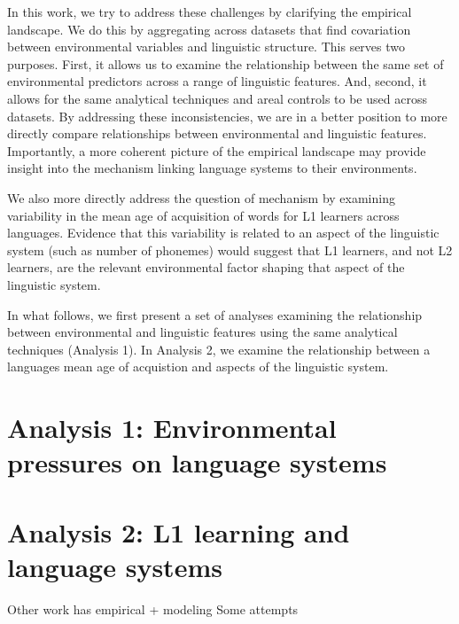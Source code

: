 \documentclass[10pt,letterpaper]{article}
\begin{document}
In this work, we try to address these challenges by clarifying the empirical landscape. We do this by aggregating across datasets that find covariation between environmental variables and linguistic structure. This serves two purposes. First, it allows us to examine the relationship between the same set of environmental predictors across a range of linguistic features. And, second, it allows for the same analytical techniques and areal controls to be used across datasets. By addressing these inconsistencies, we are in a better position to more directly compare relationships between environmental and linguistic features. Importantly, a more coherent picture of the empirical landscape may provide insight into the mechanism linking language systems to their environments.

We also more directly address the question of mechanism by examining variability in the mean age of acquisition of words for L1 learners across languages. Evidence that this variability is related to an aspect of the linguistic system (such as number of phonemes) would suggest that L1 learners, and not L2 learners, are the relevant environmental factor shaping that aspect of the linguistic system. 

In what follows, we first present a set of analyses examining the relationship between environmental and linguistic features using the same analytical techniques (Analysis 1). In Analysis 2, we examine the relationship between a languages mean age of acquistion and aspects of the linguistic system.

 
\section{Analysis 1: Environmental pressures on language systems}
\cite{jaeger2011language}
\cite{moran2012revisiting}

\section{Analysis 2: L1 learning and language systems}
\cite{luniewska2015ratings}



 Other work has empirical + modeling
Some attempts
\cite{silvey2015word}
\cite{perfors2011language}
\end{document}
